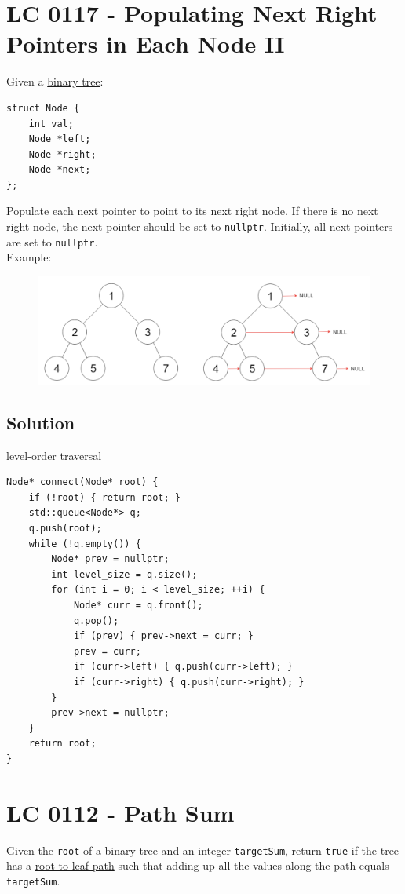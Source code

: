 \section{LC 0117 - Populating Next Right Pointers in Each Node II}
Given a \ul{binary tree}:
\begin{lstlisting}
struct Node {
	int val;
	Node *left;
	Node *right;
	Node *next;
};
\end{lstlisting}
Populate each next pointer to point to its next right node. If there is no next right node, the next pointer should be set to {\colorbox{CodeBackground}{\lstinline|nullptr|}}. Initially, all next pointers are set to {\colorbox{CodeBackground}{\lstinline|nullptr|}}.\\

Example:
\begin{figure}[H]
	\centering
	\includegraphics[width=0.65\linewidth]{images/lc0117_example}
	\label{fig:lc0117example}
\end{figure}

\subsection*{Solution}
level-order traversal
\begin{lstlisting}
Node* connect(Node* root) {
	if (!root) { return root; }
	std::queue<Node*> q;
	q.push(root);
	while (!q.empty()) {
		Node* prev = nullptr;
		int level_size = q.size();
		for (int i = 0; i < level_size; ++i) {
			Node* curr = q.front();
			q.pop();
			if (prev) { prev->next = curr; }
			prev = curr;
			if (curr->left) { q.push(curr->left); }
			if (curr->right) { q.push(curr->right); }
		}
		prev->next = nullptr;
	}
	return root;
}
\end{lstlisting}

\section{LC 0112 - Path Sum}\label{lc0112}
Given the {\colorbox{CodeBackground}{\lstinline|root|}} of a \ul{binary tree} and an integer {\colorbox{CodeBackground}{\lstinline|targetSum|}}, return {\colorbox{CodeBackground}{\lstinline|true|}} if the tree has a \ul{root-to-leaf path} such that adding up all the values along the path equals {\colorbox{CodeBackground}{\lstinline|targetSum|}}.\\

